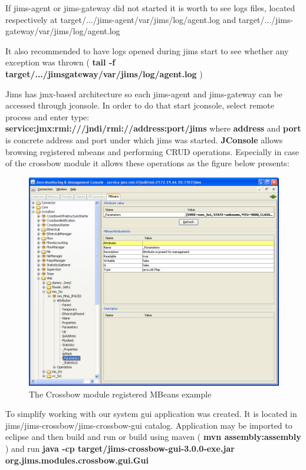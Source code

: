 \documentclass[11pt]{book}
\begin{document}
		
		If jims-agent or jims-gateway did not started it is worth to see logs files, located respectively at target/.../jims-agent/var/jims/log/agent.log
		and target/.../jims-gateway/var/jims/log/agent.log
		
		It also recommended to have logs opened during jims start to see whether any exception was thrown ( \textbf{tail -f target/.../jims\-gateway/var/jims/log/agent.log} )
		
		Jims has jmx-based architecture so each jims-agent and jims-gateway can be accessed through jconsole. In order to do that start 
		jconsole, select remote process and enter type: \\ \textbf{service:jmx:rmi:///jndi/rmi://address:port/jims} where \textbf{address} and 
		\textbf{port} is concrete address and port under which jims was started. \textbf{JConsole} allows browsing registered mbeans and 
		performing CRUD operations. Especially in case of the crossbow module it allows these operations as
		the figure below presents:
		
		\begin{figure}[H]
                  \begin{center}
                    \includegraphics[width=1.0\textwidth]{img/impl/jconsole.png}
                  \end{center}
                  \caption{The Crossbow module registered MBeans example}
                \end{figure}
		
		To simplify working with our system gui application was created. It is located in jims/jims-crossbow/jims-crossbow-gui catalog. Application 
		may be imported to eclipse and then build and run or build using maven (\textbf{ mvn assembly:assembly }) and run 
                \textbf{java -cp target/jims-crossbow-gui-3.0.0-exe.jar org.jims.modules.crossbow.gui.Gui}
\end{document}
